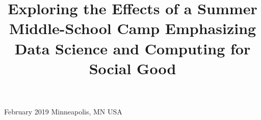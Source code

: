 



  {February 2019}
  {Minneapolis, MN USA} 



\newenvironment{blockquote}{%
  \list{} {
    \leftmargin0.2in
    \rightmargin\leftmargin
  }
  \slshape
  \item\relax}
{\endlist}


\title[A Middle School Camp: Data Science \& Computing for Social Good]{Exploring the Effects of a Summer Middle-School Camp Emphasizing Data Science and Computing for Social Good}

